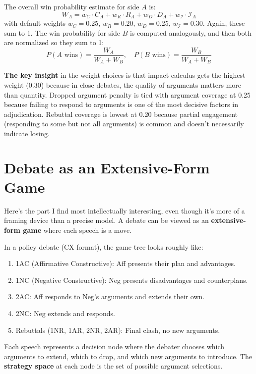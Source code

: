 \documentclass[11pt]{article}
\begin{document}
The overall win probability estimate for side $A$ is:
\[
    W_A = w_C \cdot C_A + w_R \cdot R_A + w_D \cdot D_A + w_\mathcal{I} \cdot \mathcal{I}_A
\]
with default weights $w_C = 0.25$, $w_R = 0.20$, $w_D = 0.25$, $w_\mathcal{I} = 0.30$. Again, these sum to 1. The win probability for side $B$ is computed analogously, and then both are normalized so they sum to 1:
\[
    P(A \text{ wins}) = \frac{W_A}{W_A + W_B}, \quad P(B \text{ wins}) = \frac{W_B}{W_A + W_B}
\]

\textbf{The key insight} in the weight choices is that impact calculus gets the highest weight (0.30) because in close debates, the quality of arguments matters more than quantity. Dropped argument penalty is tied with argument coverage at 0.25 because failing to respond to arguments is one of the most decisive factors in adjudication. Rebuttal coverage is lowest at 0.20 because partial engagement (responding to some but not all arguments) is common and doesn't necessarily indicate losing.

\section{Debate as an Extensive-Form Game}

Here's the part I find most intellectually interesting, even though it's more of a framing device than a precise model. A debate can be viewed as an \textbf{extensive-form game} where each speech is a move.

In a policy debate (CX format), the game tree looks roughly like:

\begin{enumerate}
    \item 1AC (Affirmative Constructive): Aff presents their plan and advantages.
    \item 1NC (Negative Constructive): Neg presents disadvantages and counterplans.
    \item 2AC: Aff responds to Neg's arguments and extends their own.
    \item 2NC: Neg extends and responds.
    \item Rebuttals (1NR, 1AR, 2NR, 2AR): Final clash, no new arguments.
\end{enumerate}

Each speech represents a decision node where the debater chooses which arguments to extend, which to drop, and which new arguments to introduce. The \textbf{strategy space} at each node is the set of possible argument selections.
\end{document}
